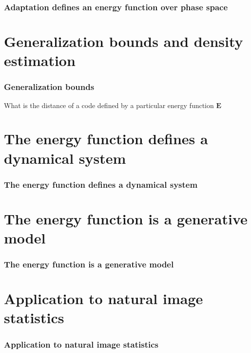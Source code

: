 \documentclass{beamer}
\begin{document}
\begin{frame}[plain]
\frametitle{Adaptation defines an energy function over phase space} 
\end{frame}

\section{Generalization bounds and density estimation} 

\begin{frame}[plain]
\frametitle{Generalization bounds}
What is the distance of a code defined by a particular energy function $\mathbf{E}$
\end{frame}

\section{The energy function defines a dynamical system} 

\begin{frame}[plain]
\frametitle{The energy function defines a dynamical system} 
\end{frame}


\section{The energy function is a generative model} 

\begin{frame}[plain]
\frametitle{The energy function is a generative model} 
\end{frame}

\section{Application to natural image statistics} 

\begin{frame}[plain]
\frametitle{Application to natural image statistics} 
\end{frame}
\end{document}

